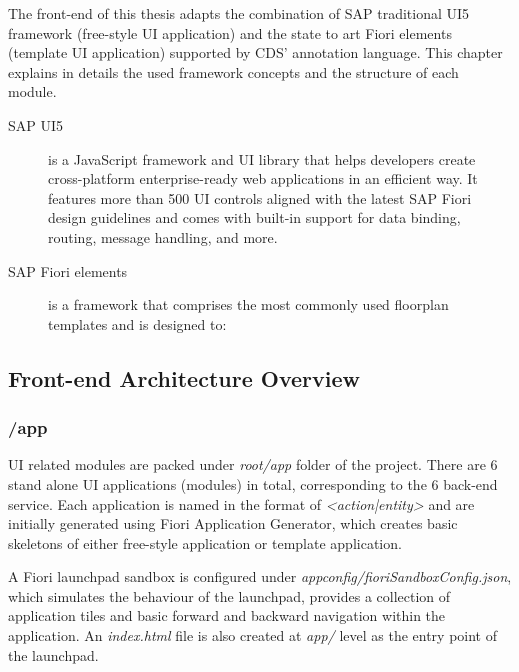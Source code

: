 The front-end of this thesis adapts the combination of SAP traditional UI5 framework (free-style UI application) and the state to art Fiori elements (template UI application) supported by CDS' annotation language. \cite{fiori-design} This chapter explains in details the used framework concepts and the structure of each module.

\begin{description}
	\item[SAP UI5] is a JavaScript framework and UI library that helps developers create cross-platform enterprise-ready web applications in an efficient way. It features more than 500 UI controls aligned with the latest SAP Fiori design guidelines and comes with built-in support for data binding, routing, message handling, and more. \cite{ui5}
 
	\item[SAP Fiori elements] is a framework that comprises the most commonly used floorplan templates and is designed to:
        \cite{fiorielements}
\end{description}

\subsection{Front-end Architecture Overview}

\subsubsection{/app}

UI related modules are packed under \textit{root/app} folder of the project. There are 6 stand alone UI applications (modules) in total, corresponding to the 6 back-end service. Each application is named in the format of \textit{<action|entity>} and are initially generated using Fiori Application Generator, which creates basic skeletons of either free-style application or template application. 

A Fiori launchpad sandbox is configured under \textit{appconfig/fioriSandboxConfig.json}, which simulates the behaviour of the launchpad, provides a collection of application tiles and basic forward and backward navigation within the application. An \textit{index.html} file is also created at \textit{app/} level as the entry point of the launchpad.

